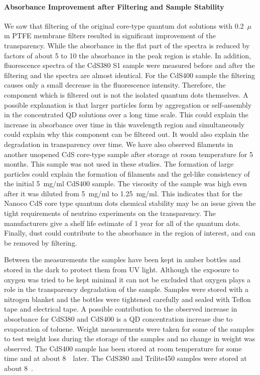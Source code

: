 \documentclass[cits]{JINST}
\begin{document}
\paragraph{Absorbance Improvement after Filtering and Sample Stability}
We saw that filtering of the original core-type quantum dot solutions with 0.2~$\mu$m PTFE membrane filters resulted in significant improvement of the transparency. While the absorbance in the flat part of the spectra is reduced by factors of about 5 to 10 the absorbance in the peak region is stable. In addition, fluorescence spectra of the CdS380 S1 sample were measured before and after the filtering and the spectra are almost identical. For the CdS400 sample the filtering causes only a small decrease in the fluorescence intensity. Therefore, the component which is filtered out is not the isolated quantum dots themselves. A possible explanation is that larger particles form by aggregation or self-assembly in the concentrated QD solutions over a long time scale. This could explain the increase in absorbance over time in this wavelength region and simultaneously could explain why this component can be filtered out. It would also explain the degradation in transparency over time. We have also observed filaments in another unopened CdS core-type sample after storage at room temperature for 5 months. This sample was not used in these studies. The formation of large particles could explain the formation of filaments and the gel-like consistency of the initial 5~mg/ml CdS400 sample. The viscosity of the sample was high even after it was diluted from 5~mg/ml to 1.25~mg/ml. This indicates that for the Nanoco CdS core type quantum dots chemical stability may be an issue given the tight requirements of neutrino experiments on the transparency. The manufacturers give a shelf life estimate of 1 year for all of the quantum dots. Finally, dust could contribute to the absorbance in the region of interest, and can be removed by filtering.  

Between the measurements the samples have been kept in amber bottles and stored in the dark to protect them from UV light. Although the exposure to oxygen was tried to be kept minimal it can not be excluded that oxygen plays a role in the transparency degradation of the sample. Samples were stored with a nitrogen blanket and the bottles were tightened carefully and sealed with Teflon tape and electrical tape. A possible contribution to the observed increase in absorbance for CdS380 and CdS400 is a QD concentration increase due to evaporation of toluene. Weight measurements were taken for some of the samples to test weight loss during the storage of the samples and no change in weight was observed. The CdS400 sample has been stored at room temperature for some time and at about 8~\textcelsius ~later. The CdS380 and Trilite450 samples were stored at about 8~\textcelsius.
\end{document}
